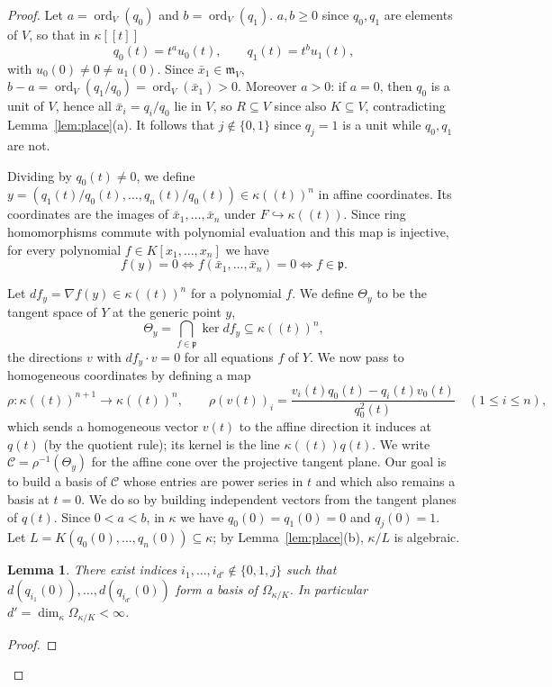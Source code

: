 \documentclass[pdflatex,sn-mathphys-num]{sn-jnl}
\numberwithin{equation}{section}
\theoremstyle{thmstyleone}
\newtheorem{lemma}[theorem]{Lemma}
\theoremstyle{thmstyletwo}
\begin{document}
\begin{proof}
Let $a=\operatorname{ord}_V(q_0)$ and $b=\operatorname{ord}_V(q_1)$. $a,b\geq 0$ since $q_0,q_1$ are elements of $V$, so that in $\kappa[[t]]$
\[q_0(t)=t^au_0(t),\qquad q_1(t)=t^bu_1(t),\]
with $u_0(0)\neq0\neq u_1(0)$. Since $\bar x_1\in\mathfrak m_V$, $b-a=\operatorname{ord}_V(q_1/q_0) = \operatorname{ord}_V(\bar x_1)>0$. Moreover
$a>0$: if $a=0$, then $q_0$ is a unit of $V$, hence all $\bar x_i=q_i/q_0$
lie in $V$, so $R\subseteq V$ since also $K\subseteq V$, contradicting Lemma~\ref{lem:place}(a). It follows that $j \notin \{0,1\}$ since $q_j = 1$ is a unit while $q_0,q_1$ are not.

Dividing by $q_0(t)\neq 0$, we define $y=(q_1(t)/q_0(t),\dots,q_n(t)/q_0(t))\in\kappa((t))^n$ in affine coordinates. Its
coordinates are the images of $\bar x_1,\dots,\bar x_n$ under $F\hookrightarrow
\kappa((t))$. Since ring homomorphisms commute with polynomial evaluation and
this map is injective, for every polynomial $f\in K[x_1,\dots,x_n]$ we have
\begin{equation}
    f(y)=0\iff f(\bar x_1,\dots,\bar x_n)=0 \iff  f\in\mathfrak p.
    \label{eq:generic}
\end{equation}

Let $df_y=\nabla f(y)\in\kappa((t))^n$ for a polynomial $f$.
We define $\Theta_y$ to be the tangent space of $Y$ at the generic point $y$,
\[ \Theta_y=\bigcap_{f\in\mathfrak p}\ker df_y\subseteq\kappa((t))^n,\]
the directions $v$ with $df_y\cdot v=0$ for all equations $f$ of $Y$. We now pass to homogeneous coordinates by defining a map
\[ \rho\colon\kappa((t))^{n+1}\to\kappa((t))^n,\qquad
 \rho(v(t))_i=\frac{v_i(t)q_0(t)-q_i(t)v_0(t)}{q_0^2(t)}\quad(1\le i\le n),\]
which sends a homogeneous vector $v(t)$ to the affine direction it induces at $q(t)$
(by the quotient rule); its kernel is the line $\kappa((t))q(t)$. We write
$\mathcal C=\rho^{-1}(\Theta_y)$ for the affine cone over the projective tangent
plane. Our goal is to build a basis of $\mathcal C$ whose entries are power
series in $t$ and which also remains a basis at $t=0$. 
We do so by building independent vectors from the tangent planes of $q(t)$.
Since $0<a<b$, in $\kappa$ we have $q_0(0)=q_1(0)=0$ and $q_j(0)=1$. Let
$L=K(q_0(0),\dots,q_n(0))\subseteq\kappa$; by Lemma~\ref{lem:place}(b),
$\kappa/L$ is algebraic.

\begin{lemma}\label{lem:kappa}
There exist indices $i_1,\dots,i_{d'}\notin\{0,1,j\}$ such that
$d(q_{i_1}(0)),\dots,d(q_{i_{d'}}(0))$ form a basis of $\Omega_{\kappa/K}$. In
particular $d' = \dim_\kappa\Omega_{\kappa/K}<\infty$.
\end{lemma}
\begin{proof}


\end{proof}
\end{proof}
\end{document}
